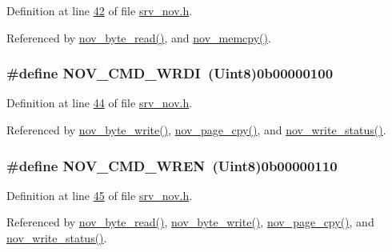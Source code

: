 Definition at line \hyperlink{a00029_source_l00042}{42} of file \hyperlink{a00029_source}{srv\+\_\+nov.\+h}.



Referenced by \hyperlink{a00060_source_l00633}{nov\+\_\+byte\+\_\+read()}, and \hyperlink{a00060_source_l00723}{nov\+\_\+memcpy()}.

\hypertarget{a00029_a3924df5fbf1e1ff642a9bde06e17b69d}{
\subsubsection[{N\+O\+V\+\_\+\+C\+M\+D\+\_\+\+W\+R\+D\+I}]{\setlength{\rightskip}{0pt plus 5cm}\#define N\+O\+V\+\_\+\+C\+M\+D\+\_\+\+W\+R\+D\+I~({\bf Uint8})0b00000100}}\label{a00029_a3924df5fbf1e1ff642a9bde06e17b69d}


Definition at line \hyperlink{a00029_source_l00044}{44} of file \hyperlink{a00029_source}{srv\+\_\+nov.\+h}.



Referenced by \hyperlink{a00060_source_l00608}{nov\+\_\+byte\+\_\+write()}, \hyperlink{a00060_source_l00663}{nov\+\_\+page\+\_\+cpy()}, and \hyperlink{a00060_source_l00586}{nov\+\_\+write\+\_\+status()}.

\hypertarget{a00029_acc9f91a7c7d40a32755560dda080cf98}{
\subsubsection[{N\+O\+V\+\_\+\+C\+M\+D\+\_\+\+W\+R\+E\+N}]{\setlength{\rightskip}{0pt plus 5cm}\#define N\+O\+V\+\_\+\+C\+M\+D\+\_\+\+W\+R\+E\+N~({\bf Uint8})0b00000110}}\label{a00029_acc9f91a7c7d40a32755560dda080cf98}


Definition at line \hyperlink{a00029_source_l00045}{45} of file \hyperlink{a00029_source}{srv\+\_\+nov.\+h}.



Referenced by \hyperlink{a00060_source_l00633}{nov\+\_\+byte\+\_\+read()}, \hyperlink{a00060_source_l00608}{nov\+\_\+byte\+\_\+write()}, \hyperlink{a00060_source_l00663}{nov\+\_\+page\+\_\+cpy()}, and \hyperlink{a00060_source_l00586}{nov\+\_\+write\+\_\+status()}.

